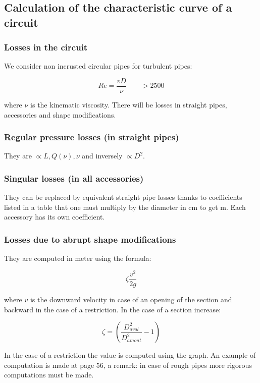 \subsection{Calculation of the characteristic curve of a circuit} 
\subsubsection{Losses in the circuit}
We consider non incrusted circular pipes for turbulent pipes: 

\begin{equation}
Re = \frac{vD}{\nu}\qquad > 2500
\end{equation}

where $\nu$ is the kinematic viscosity. There will be losses in straight pipes, accessories and shape modifications. 

\subsubsection{Regular pressure losses (in straight pipes)}
They are $\propto L, Q (\nu), \nu$ and inversely $\propto D^2$. 

\subsubsection{Singular losses (in all accessories)}
They can be replaced by equivalent straight pipe losses thanks to coefficients listed in a table that one must multiply by the diameter in cm to get m. Each accessory has its own coefficient. 

\subsubsection{Losses due to abrupt shape modifications}
They are computed in meter using the formula: 

\begin{equation}
\zeta \frac{v^2}{2g}
\end{equation}

where $v$ is the downward velocity in case of an opening of the section and backward in the case of a restriction. In the case of a section increase: 

\begin{equation}
\zeta = \left(\frac{D^2_{aval}}{D^2_{amont}} - 1 \right)
\end{equation}

In the case of a restriction the value is computed using the graph. An example of computation is made at page 56, a remark: in case of rough pipes more rigorous computations must be made. 


